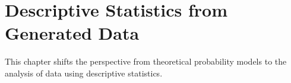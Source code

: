 \chapter{Descriptive Statistics from Generated Data}

This chapter shifts the perspective from theoretical probability models to the analysis of data using descriptive statistics.

